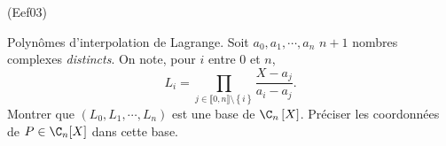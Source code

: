 \begin{tiny}(Eef03)\end{tiny}
Polyn{\^o}mes d'interpolation de Lagrange.\newline
Soit $a_{0},a_{1},\cdots, a_{n}$ $n+1$ nombres complexes \emph{distincts}. On note, pour $i$ entre 0 et $n$,
\[
L_{i}=\prod_{j\in \llbracket 0, n\rrbracket \setminus\left\lbrace i\right\rbrace }\frac{X-a_{j}}{a_{i}-a_{j}}.
\]
Montrer que $(L_{0},L_{1},\cdots ,L_{n})$ est une base de $\C_{n}\left[ X\right]$. Pr{\'e}ciser les coordonn{\'e}es de $P \in \C_n[X]$ dans cette base.
